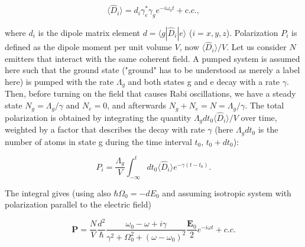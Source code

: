 \documentclass[12pt]{iopart}
\begin{document}
\begin{equation}
\langle \hat{D}_i \rangle = d_i \gamma_e^{*} \gamma_g e^{-i \omega_0 t} + c.c. ,
\end{equation} 

\noindent where $d_i$ is the dipole matrix element $d=\langle g | \hat{D}_i | e \rangle$ ($i=x,y,z$). 
Polarization $P_i$ is defined as the dipole moment per unit volume $V$, now $\langle \hat{D}_i \rangle/V$. Let us consider $N$ emitters that interact with the same coherent field. A pumped system is assumed here such that the ground state ("ground" has to be understood as merely a label here) is pumped with the rate $\Lambda_g$ and both states g and e decay with a rate $\gamma$. Then, before turning on the field that causes Rabi oscillations, we have a steady state $N_g = \Lambda_g/\gamma$ and $N_e=0$, and afterwards $N_g+N_e=N=\Lambda_g/\gamma$. The total polarization is obtained by integrating the quantity $\Lambda_g dt_0 \langle \hat{D}_i \rangle/V$ over time, weighted by a factor that describes the decay with rate $\gamma$ (here $\Lambda_g dt_0$ is the number of atoms in state g during the time interval $t_0$, $t_0+dt_0$):

\begin{equation}
P_i = \frac{\Lambda_g}{V} \int_{-\infty}^t dt_0 \langle \hat{D}_i \rangle e^{-\gamma (t - t_0)} .
\end{equation} 

The integral gives (using also $\hbar \Omega_0 = - d E_0$ and assuming isotropic system with polarization parallel to the electric field) 

\begin{equation}
\mathbf{P} = \frac{N}{V} \frac{d^2}{\hbar} \frac{\omega_0-\omega + i \gamma}{\gamma^2 + \Omega_0^2 
+ (\omega - \omega_0)^2} \frac{\mathbf{E}_0}{2} e^{-i \omega t} + c.c.  \label{averagePPT}
\end{equation} 
\end{document}
